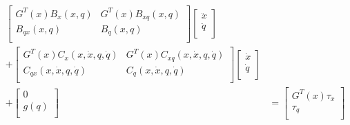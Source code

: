 \begin{equation}
\begin{split}
	\left[\begin{matrix}G^T(x)B_x(x,q)&G^T(x)B_{xq}(x,q)\\B_{qx}(x,q)&B_q(x,q)\\\end{matrix}\right]\left[\begin{matrix}\ddot{x}\\\ddot{q}\\\end{matrix}\right] &\\
	+\left[\begin{matrix}G^T(x)C_x(x,\dot{x},q,\dot{q})&G^T(x)C_{xq}(x,\dot{x},q,\dot{q})\\C_{qx}(x,\dot{x},q,\dot{q})&C_q(x,\dot{x},q,\dot{q})\\\end{matrix}\right]\left[\begin{matrix}\dot{x}\\\dot{q}\\\end{matrix}\right] &\\
	+\left[\begin{matrix}0\\g(q)\\\end{matrix}\right]
	&= \left[\begin{matrix}G^T(x)\tau_x\\\tau_q\\\end{matrix}\right]
\end{split}
\end{equation}

